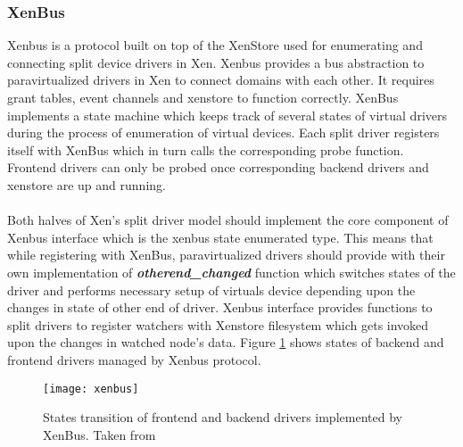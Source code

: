 \subsubsection{XenBus\label{sec:xenbus}} 
Xenbus \cite{Xenbus} is a protocol built on top of the XenStore used for enumerating and connecting split device drivers in Xen. Xenbus provides a bus abstraction to paravirtualized drivers in Xen to connect domains with each other. It requires grant tables, event channels and xenstore to function correctly. XenBus implements a state machine which keeps track of several states of virtual drivers during the process of enumeration of virtual devices. Each split driver registers itself with XenBus which in turn calls the corresponding probe function. Frontend drivers can only be probed once corresponding backend drivers and xenstore are up and running.
\\
\\
Both halves of Xen's split driver model should implement the core component of Xenbus interface which is the xenbus state enumerated type. This means that while registering with XenBus, paravirtualized drivers should provide with their own implementation of \textit{\textbf{otherend\_changed}} function which switches states of the driver and performs necessary setup of virtuals device depending upon the changes in state of other end of driver. Xenbus interface provides functions to split drivers to register watchers with Xenstore filesystem which gets invoked upon the changes in watched node's data. Figure \ref{xenbus} shows states of backend and frontend drivers managed by Xenbus protocol.

\begin{figure}[!htbp]
	\centering
	\texttt{[image: xenbus]}
	\caption{States transition of frontend and backend drivers implemented by XenBus. Taken from \cite{cho2007sharing}}
	\label{xenbus}
\end{figure}


